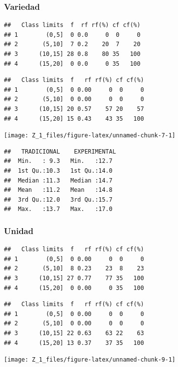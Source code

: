 \documentclass[12pt,]{report}
\begin{document}
\hypertarget{variedad}{%
\subsubsection{Variedad}\label{variedad}}

\begin{verbatim}
##   Class limits  f  rf rf(%) cf cf(%)
## 1        (0,5]  0 0.0     0  0     0
## 2       (5,10]  7 0.2    20  7    20
## 3      (10,15] 28 0.8    80 35   100
## 4      (15,20]  0 0.0     0 35   100
\end{verbatim}

\begin{verbatim}
##   Class limits  f   rf rf(%) cf cf(%)
## 1        (0,5]  0 0.00     0  0     0
## 2       (5,10]  0 0.00     0  0     0
## 3      (10,15] 20 0.57    57 20    57
## 4      (15,20] 15 0.43    43 35   100
\end{verbatim}

\begin{center}\texttt{[image: Z\_1\_files/figure-latex/unnamed-chunk-7-1]} \end{center}

\begin{verbatim}
##   TRADICIONAL    EXPERIMENTAL 
##  Min.   : 9.3   Min.   :12.7  
##  1st Qu.:10.3   1st Qu.:14.0  
##  Median :11.3   Median :14.7  
##  Mean   :11.2   Mean   :14.8  
##  3rd Qu.:12.0   3rd Qu.:15.7  
##  Max.   :13.7   Max.   :17.0
\end{verbatim}

\hypertarget{unidad}{%
\subsubsection{Unidad}\label{unidad}}

\begin{verbatim}
##   Class limits  f   rf rf(%) cf cf(%)
## 1        (0,5]  0 0.00     0  0     0
## 2       (5,10]  8 0.23    23  8    23
## 3      (10,15] 27 0.77    77 35   100
## 4      (15,20]  0 0.00     0 35   100
\end{verbatim}

\begin{verbatim}
##   Class limits  f   rf rf(%) cf cf(%)
## 1        (0,5]  0 0.00     0  0     0
## 2       (5,10]  0 0.00     0  0     0
## 3      (10,15] 22 0.63    63 22    63
## 4      (15,20] 13 0.37    37 35   100
\end{verbatim}

\begin{center}\texttt{[image: Z\_1\_files/figure-latex/unnamed-chunk-9-1]} \end{center}
\end{document}
